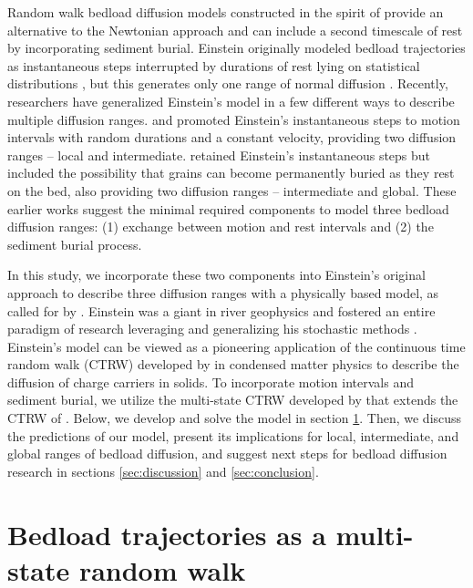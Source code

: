Random walk bedload diffusion models constructed in the spirit of \citet{Einstein1937} provide an alternative to the Newtonian approach and can include a second timescale of rest by incorporating sediment burial.
Einstein originally modeled bedload trajectories as instantaneous steps interrupted by durations of rest lying on statistical distributions \citep{Hassan1991}, but this generates only one range of normal diffusion \citep{Einstein1937,Hubbell1964,Nakagawa1976}.
Recently, researchers have generalized Einstein's model in a few different ways to describe multiple diffusion ranges.
\citet{Lisle1998} and \citet{Lajeunesse2017} promoted Einstein's instantaneous steps to motion intervals with random durations and a constant velocity, providing two diffusion ranges -- local and intermediate.
\citet{Wu2019} retained Einstein's instantaneous steps but included the possibility that grains can become permanently buried as they rest on the bed, also providing two diffusion ranges -- intermediate and global. 
These earlier works suggest the minimal required components to model three bedload diffusion ranges: (1) exchange between motion and rest intervals and (2) the sediment burial process.

In this study, we incorporate these two components into Einstein's original approach to describe three diffusion ranges with a physically based model, as called for by \citet{Nikora2002}.
Einstein was a giant in river geophysics and fostered an entire paradigm of research leveraging and generalizing his stochastic methods \citep{Hubbell1964, Yano1969, Yang1971, Gordon1972, Nakagawa1976,Paintal1971}.
Einstein's model can be viewed as a pioneering application of the continuous time random walk (CTRW) developed by \citet{Montroll1965} in condensed matter physics to describe the diffusion of charge carriers in solids.
To incorporate motion intervals and sediment burial, we utilize the multi-state CTRW developed by \citet{Weiss1976, Weiss1994} that extends the CTRW of \citet{Montroll1965}.
Below, we develop and solve the model in section \ref{sec:model}. Then, we discuss the predictions of our model, present its implications for local, intermediate, and global ranges of bedload diffusion, and suggest next steps for bedload diffusion research in sections \ref{sec:discussion} and \ref{sec:conclusion}.

\section{Bedload trajectories as a multi-state random walk}
\label{sec:model}
